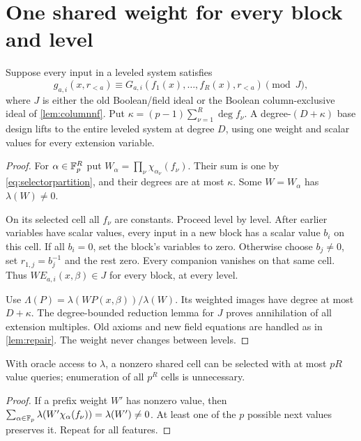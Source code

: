 \section{One shared weight for every block and level}
\begin{lemma}\label{lem:sharedfeatures}
Suppose every input in a leveled system satisfies
\[
 g_{a,i}(x,r_{<a})\equiv
 G_{a,i}(f_1(x),\ldots,f_R(x),r_{<a})\pmod J,
\]
where $J$ is either the old Boolean/field ideal or the Boolean column-exclusive ideal of \cref{lem:columnnf}. Put
$\kappa=(p-1)\sum_{\nu=1}^R\deg f_\nu$.
A degree-$(D+\kappa)$ base design lifts to the entire leveled system at degree $D$, using one weight and scalar values for every extension variable.
\end{lemma}
\begin{proof}
For $\alpha\in\mathbb F_p^R$ put
$W_\alpha=\prod_\nu\chi_{\alpha_\nu}(f_\nu)$.
Their sum is one by \eqref{eq:selectorpartition}, and their degrees are at most $\kappa$. Some $W=W_\alpha$ has $\lambda(W)\ne0$.

On its selected cell all $f_\nu$ are constants. Proceed level by level. After earlier variables have scalar values, every input in a new block has a scalar value $b_i$ on this cell. If all $b_i=0$, set the block's variables to zero. Otherwise choose $b_j\ne0$, set $r_{1,j}=b_j^{-1}$ and the rest zero. Every companion vanishes on that same cell. Thus $WE_{a,i}(x,\beta)\in J$ for every block, at every level.

Use $\Lambda(P)=\lambda(WP(x,\beta))/\lambda(W)$. Its weighted images have degree at most $D+\kappa$. The degree-bounded reduction lemma for $J$ proves annihilation of all extension multiples. Old axioms and new field equations are handled as in \cref{lem:repair}. The weight never changes between levels.
\end{proof}

\begin{corollary}\label{cor:greedycell}
With oracle access to $\lambda$, a nonzero shared cell can be selected with at most $pR$ value queries; enumeration of all $p^R$ cells is unnecessary.
\end{corollary}
\begin{proof}
If a prefix weight $W'$ has nonzero value, then
$\sum_{\alpha\in\mathbb F_p}\lambda(W'\chi_\alpha(f_\nu))=\lambda(W')\ne0$.
At least one of the $p$ possible next values preserves it. Repeat for all features.
\end{proof}

